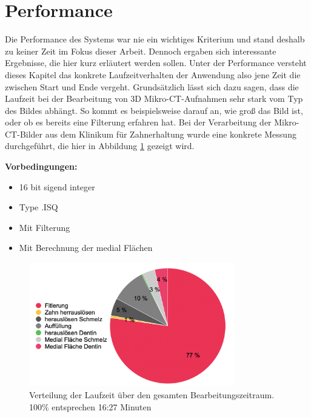 \pagebreak

\section{Performance}
Die Performance des Systems war nie ein wichtiges Kriterium und stand deshalb zu
keiner Zeit im Fokus dieser Arbeit. Dennoch ergaben sich interessante Ergebnisse,
die hier kurz erläutert werden sollen. Unter der Performance versteht dieses Kapitel
das konkrete Laufzeitverhalten der Anwendung also jene Zeit die zwischen Start und
Ende vergeht. Grundsätzlich lässt sich dazu sagen, dass die Laufzeit bei der Bearbeitung
von 3D Mikro-\ac{CT}-Aufnahmen sehr stark vom Typ des Bildes abhängt. So kommt es
beispielsweise darauf an, wie groß das Bild ist, oder ob es bereits eine Filterung
erfahren hat. Bei der Verarbeitung der Mikro-\ac{CT}-Bilder aus dem Klinikum für
Zahnerhaltung wurde eine konkrete Messung durchgeführt, die hier in Abbildung
\ref{fig:laufzeit} gezeigt wird.

\textbf{Vorbedingungen:}
\begin{itemize}
	\item 16 bit sigend integer

	\item Type .ISQ

	\item Mit Filterung

	\item Mit Berechnung der medial Flächen
\end{itemize}

\begin{figure}[h]
	\centering
	\includegraphics[width=0.8\textwidth]{img/laufzeit_diagramm.png}
	\caption{Verteilung der Laufzeit über den gesamten Bearbeitungszeitraum. 100\%
	entsprechen 16:27 Minuten}
	\label{fig:laufzeit}
\end{figure}

